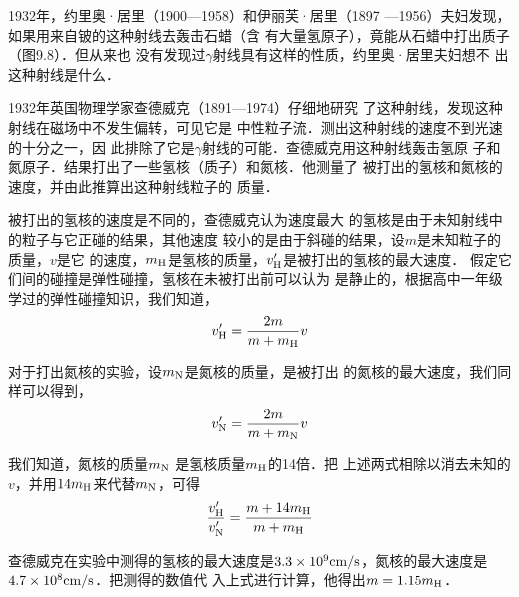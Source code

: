 1932年，约里奥·居里（1900—1958）和伊丽芙·居里（1897
—1956）夫妇发现，如果用来自铍的这种射线去轰击石蜡（含
有大量氢原子），竟能从石蜡中打出质子（图9.8）．但从来也
没有发现过$\gamma$射线具有这样的性质，约里奥·居里夫妇想不
出这种射线是什么．
\begin{figure}[htp]\centering
{}
\caption{}
\end{figure}

1932年英国物理学家查德威克（1891—1974）仔细地研究
了这种射线，发现这种射线在磁场中不发生偏转，可见它是
中性粒子流．测出这种射线的速度不到光速的十分之一，因
此排除了它是$\gamma$射线的可能．查德威克用这种射线轰击氢原
子和氮原子．结果打出了一些氢核（质子）和氮核．他测量了
被打出的氢核和氮核的速度，并由此推算出这种射线粒子的
质量．

被打出的氢核的速度是不同的，查德威克认为速度最大
的氢核是由于未知射线中的粒子与它正碰的结果，其他速度
较小的是由于斜碰的结果，设$m$是未知粒子的质量，$v$是它
的速度，$m_{\rm H}$是氢核的质量，$v'_{\rm H}$是被打出的氢核的最大速度．
假定它们间的碰撞是弹性碰撞，氢核在未被打出前可以认为
是静止的，根据高中一年级学过的弹性碰撞知识，我们知道，
\[ v'_{\rm H}=\frac{2m}{m+m_{\rm H}}v \]

对于打出氮核的实验，设$m_{\rm N}$是氮核的质量，是被打出
的氮核的最大速度，我们同样可以得到，
\[ v'_{\rm N}=\frac{2m}{m+m_{\rm N}}v\]

我们知道，氮核的质量$m_{\rm N}$
是氢核质量$m_{\rm H}$的14倍．把
上述两式相除以消去未知的$v$，并用$14m_{\rm H}$来代替$m_{\rm N}$，可得
\[ \frac{v'_{\rm H}}{v'_{\rm N}} =\frac{m+14m_{\rm H}}{m+m_{\rm H}}\]

查德威克在实验中测得的氢核的最大速度是$3.3\times10^9{\rm cm}/{\rm s}$，氮核的最大速度是$4.7\times10^8{\rm cm}/{\rm s}$．把测得的数值代
入上式进行计算，他得出$m=1.15m_{\rm H}$．

